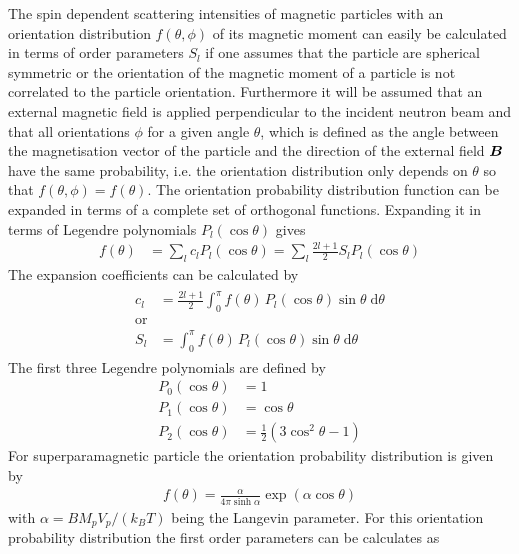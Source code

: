\noindent
The spin dependent scattering intensities of magnetic particles with an orientation distribution
$f\left(\theta,\phi\right)$ of its magnetic moment can easily be calculated in terms of order
parameters $S_l$ if one assumes that the particle
are spherical symmetric or the orientation of the magnetic moment of a particle is not correlated to the
particle orientation. Furthermore it will be assumed that an external magnetic field is applied perpendicular
to the incident neutron beam and that all orientations $\phi$ for a given angle $\theta$, which is defined
as the angle between the magnetisation vector of the particle and the direction of the external field $\BM{B}$
have the same probability, i.e. the orientation distribution only depends on $\theta$ so that
$f\left(\theta,\phi\right)=f\left(\theta\right)$. The orientation probability distribution function can be expanded
in terms of a complete set of orthogonal functions. Expanding it in terms of Legendre polynomials $P_l(\cos\theta)$ gives
\begin{align}
f(\theta) &= \sum_l c_l P_l(\cos\theta) = \sum_l \frac{2l+1}{2} S_l P_l(\cos\theta)
\end{align}
The expansion coefficients can be calculated by
\begin{align}
\begin{split}
c_l &= \frac{2l+1}{2} \int_0^\pi f(\theta)\, P_l(\cos\theta) \sin\theta \;\mathrm{d}\theta\\
\mbox{or} \\
S_l &= \int_0^\pi f(\theta) \, P_l(\cos\theta) \sin\theta\;\mathrm{d}\theta
\end{split}
\end{align}
The first three Legendre polynomials are defined by
\begin{subequations}
\begin{align}
P_0(\cos\theta) &= 1\\
P_1(\cos\theta) &= \cos\theta\ \\
P_2(\cos\theta) &= \frac{1}{2}\left(3\cos^2\theta-1\right)
\end{align}
\end{subequations}
For superparamagnetic particle the orientation probability distribution is given by
\begin{align}
f(\theta) = \frac{\alpha}{4\pi\sinh\alpha} \exp(\alpha\cos\theta)
\end{align}
with $\alpha=BM_pV_p/(k_BT)$ being the Langevin parameter. For this orientation probability distribution
the first order parameters can be calculates as
